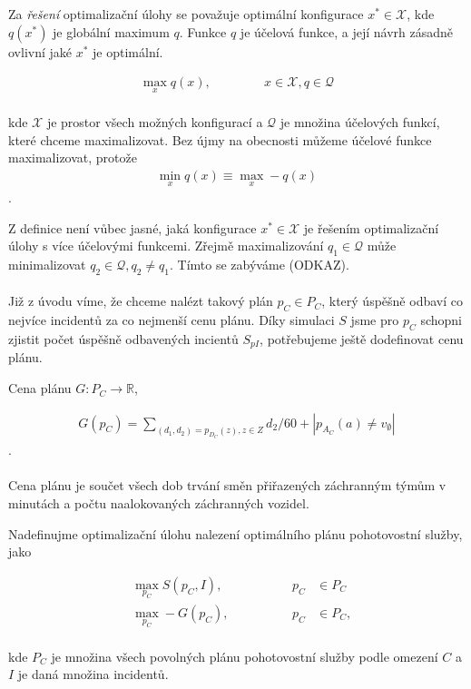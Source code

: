 Za \textit{řešení} optimalizační úlohy se považuje optimální konfigurace $x^* \in \mathcal{X}$, kde $q(x^*)$ je globální maximum $q$.
Funkce $q$ je účelová funkce, a její návrh zásadně ovlivní jaké $x^*$ je optimální. 
\\
\begin{definice}
  \begin{align}
    \max_{x} q(x), \hspace{50pt} x \in \mathcal{X}, q \in \mathcal{Q}
  \end{align}
  \\
  kde $\mathcal{X}$ je prostor všech možných konfigurací a $\mathcal{Q}$ je množina účelových funkcí, které chceme maximalizovat.
  Bez újmy na obecnosti můžeme účelové funkce maximalizovat, protože
  \begin{align}
    \min_{x} q(x) \equiv \max_{x} -q(x)
  \end{align}
  .
\end{definice}

Z definice není vůbec jasné, jaká konfigurace $x^* \in \mathcal{X}$ je řešením optimalizační úlohy s více účelovými funkcemi.
Zřejmě maximalizování $q_1 \in \mathcal{Q}$ může minimalizovat $q_2 \in \mathcal{Q}, q_2 \neq q_1$. Tímto se zabýváme (ODKAZ).
\\
\\
Již z úvodu víme, že chceme nalézt takový plán $p_C \in P_C$, který úspěšně odbaví co nejvíce incidentů za co nejmenší cenu plánu.
Díky simulaci $S$ jsme pro $p_C$ schopni zjistit počet úspěšně odbavených incientů $S_{pI}$, potřebujeme ještě dodefinovat cenu plánu.
\\
\begin{definice}
  Cena plánu $G \colon P_C \rightarrow \mathbb{R}$,

  \begin{align}
    G(p_C) = \sum_{(d_1, d_2) = p_{D_C}(z), z \in Z} d_2 / 60 + |p_{A_C}(a) \neq v_{\emptyset}|
  \end{align}
  .
  \\
  \\
  Cena plánu je součet všech dob trvání směn přiřazených záchranným týmům v minutách a počtu naalokovaných záchranných vozidel.
\end{definice}

Nadefinujme optimalizační úlohu nalezení optimálního plánu pohotovostní služby, jako
\\
\begin{definice}
  \begin{align}
    &\max_{p_C} S(p_C, I), \hspace{50pt} &p_C &\in P_C \\ 
    &\max_{p_C} -G(p_C), \hspace{50pt}    &p_C &\in P_C,
  \end{align}
  \\
  kde $P_C$ je množina všech povolných plánu pohotovostní služby podle omezení $C$ a $I$ je daná množina incidentů.
\end{definice}

